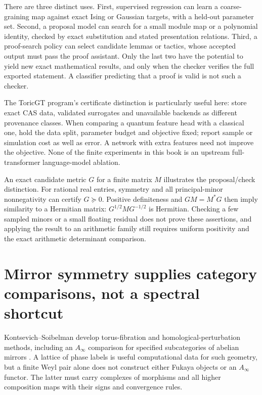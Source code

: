 \documentclass[11pt,oneside,openany]{book}
\theoremstyle{definition}\newtheorem{definition}[theorem]{Definition}
\theoremstyle{remark}\newtheorem{remark}[theorem]{Remark}
\begin{document}
There are three distinct uses. First, supervised regression can learn a
coarse-graining map against exact Ising or Gaussian targets, with a held-out
parameter set. Second, a proposal model can search for a small module map
or a polynomial identity, checked by exact substitution and stated
presentation relations. Third, a proof-search policy can select candidate
lemmas or tactics, whose accepted output must pass the proof assistant.
Only the last two have the potential to yield new exact mathematical
results, and only when the checker verifies the full exported statement.
A classifier predicting that a proof is valid is not such a checker.

The ToricGT program's certificate distinction is particularly useful here:
store exact CAS data, validated surrogates and unavailable backends as
different provenance classes. When comparing a quantum feature head with
a classical one, hold the data split, parameter budget and objective fixed;
report sample or simulation cost as well as error. A network with extra
features need not improve the objective. None of the finite experiments
in this book is an upstream full-transformer language-model ablation.

An exact candidate metric $G$ for a finite matrix $M$ illustrates the
proposal/check distinction. For rational real entries, symmetry and all
principal-minor nonnegativity can certify $G\succeq0$. Positive
definiteness and $GM=M^*G$ then imply similarity to a Hermitian matrix:
$G^{1/2}MG^{-1/2}$ is Hermitian. Checking a few sampled minors or a small
floating residual does not prove these assertions, and applying the result
to an arithmetic family still requires uniform positivity and the exact
arithmetic determinant comparison.

\section{Mirror symmetry supplies category comparisons, not a spectral shortcut}
Kontsevich--Soibelman develop torus-fibration and homological-perturbation
methods, including an $A_\infty$ comparison for specified subcategories of
abelian mirrors \cite[Sections 6--8, Theorem 4]{TGKontsevichSoibelman}.
A lattice of phase labels is useful computational data for such geometry,
but a finite Weyl pair alone does not construct either Fukaya objects or
an $A_\infty$ functor. The latter must carry complexes of morphisms and
all higher composition maps with their signs and convergence rules.
\end{document}
